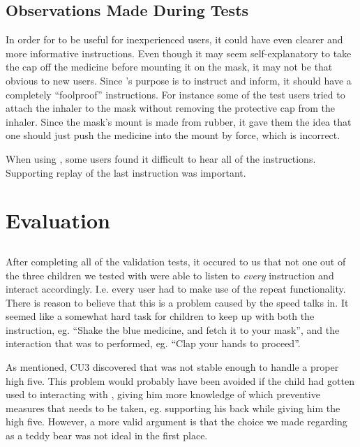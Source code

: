\subsection{Observations Made During Tests}

In order for \ab{} to be useful for inexperienced users, it could have even clearer and more informative instructions. Even though it may seem self-explanatory to take the cap off the medicine before mounting it on the mask, it may not be that obvious to new users. Since \ab{}'s purpose is to instruct and inform, it should have a completely ``foolproof'' instructions. For instance some of the test users tried to attach the inhaler to the mask without removing the protective cap from the inhaler. Since the mask's mount is made from rubber, it gave them the idea that one should just push the medicine into the mount by force, which is incorrect. 

When using \ab{}, some users found it difficult to hear all of the instructions. Supporting replay of the last instruction was important. 



\section{Evaluation}
\subsection{\ab{}}

After completing all of the validation tests, it occured to us that not one out of the three children we tested \ab{} with were able to listen to \emph{every} instruction and interact accordingly. I.e. every user had to make use of the repeat functionality. There is reason to believe that this is a problem caused by the speed \ab{} talks in. It seemed like a somewhat hard task for children to keep up with both the instruction, eg. ``Shake the blue medicine, and fetch it to your mask'', and the interaction that was to performed, eg. ``Clap your hands to proceed''. 

As mentioned, CU3 discovered that \ab{} was not stable enough to handle a proper high five. This problem would probably have been avoided if the child had gotten used to interacting with \ab{}, giving him more knowledge of which preventive measures that needs to be taken, eg. supporting his back while giving him the high five. However, a more valid argument is that the choice we made regarding \ab{} as a teddy bear was not ideal in the first place.  

